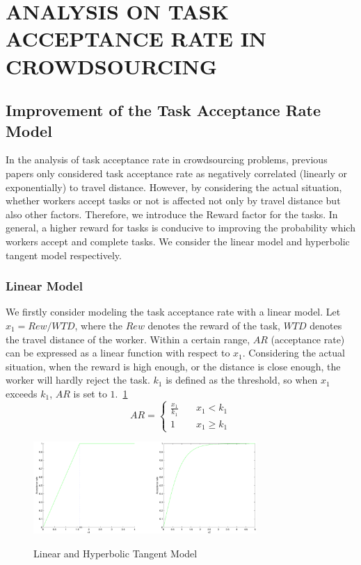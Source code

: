 \section{ANALYSIS ON TASK ACCEPTANCE RATE IN CROWDSOURCING} %
\subsection{Improvement of the Task Acceptance Rate Model} %
\label{Sec4.1}
In the analysis of task acceptance rate in crowdsourcing problems, previous papers only considered task acceptance rate as negatively correlated (linearly or exponentially) to travel distance. However, by considering the actual situation, whether workers accept tasks or not is affected not only by travel distance but also other factors. Therefore, we introduce the Reward factor for the tasks. In general, a higher reward for tasks is conducive to improving the probability which workers accept and complete tasks. We consider the linear model and hyperbolic tangent model respectively.

\subsubsection{Linear Model}
We firstly consider modeling the task acceptance rate with a linear model. Let $x_1=Rew/WTD$, where the $Rew$ denotes the reward of the task, $WTD$ denotes the travel distance of the worker. Within a certain range, $AR$ (acceptance rate) can be expressed as a linear function with respect to $x_1$. Considering the actual situation, when the reward is high enough, or the distance is close enough, the worker will hardly reject the task. $k_1$ is defined as the threshold, so when $x_1$ exceeds $k_1$, $AR$ is set to $1$.~\ref{img:LinTanh}
$$
	AR= \left \{
	\begin{array}{cl}
	\frac{x_1}{k_1} \quad & \mbox{$x_1<k_1$} \\
	1 \quad & \mbox{$x_1 \geq k_1$}
	\end{array}
	\right.
$$

\begin{figure}
\includegraphics[width=8.5cm]{LinTanh}
\label{img:LinTanh}
\caption{Linear and Hyperbolic Tangent Model}
\end{figure}

